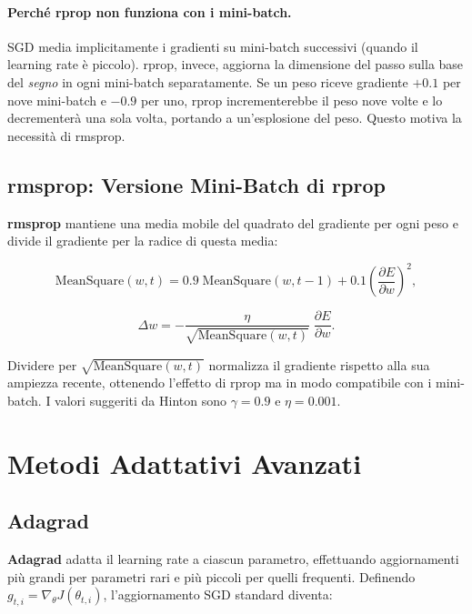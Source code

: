 \paragraph{Perché rprop non funziona con i mini-batch.}
SGD media implicitamente i gradienti su mini-batch successivi (quando il
learning rate è piccolo). rprop, invece, aggiorna la dimensione del passo sulla
base del \emph{segno} in ogni mini-batch separatamente. Se un peso riceve
gradiente $+0.1$ per nove mini-batch e $-0.9$ per uno, rprop incrementerebbe il
peso nove volte e lo decrementerà una sola volta, portando a un'esplosione del
peso. Questo motiva la necessità di rmsprop.

\subsection{rmsprop: Versione Mini-Batch di rprop}
\label{subsec:rmsprop}

\textbf{rmsprop} mantiene una media mobile del quadrato del gradiente per ogni
peso e divide il gradiente per la radice di questa media:

\begin{equation}
  \text{MeanSquare}(w, t) =
    0.9\;\text{MeanSquare}(w, t-1) + 0.1\left(\frac{\partial E}{\partial w}\right)^2,
\end{equation}

\begin{equation}
  \Delta w = -\frac{\eta}{\sqrt{\text{MeanSquare}(w,t)}}\;\frac{\partial E}{\partial w}.
\end{equation}

Dividere per $\sqrt{\text{MeanSquare}(w,t)}$ normalizza il gradiente rispetto
alla sua ampiezza recente, ottenendo l'effetto di rprop ma in modo compatibile
con i mini-batch. I valori suggeriti da Hinton sono $\gamma = 0.9$ e
$\eta = 0.001$.

\section{Metodi Adattativi Avanzati}
\label{sec:advanced-adaptive}

\subsection{Adagrad}
\label{subsec:adagrad}

\textbf{Adagrad} adatta il learning rate a ciascun parametro, effettuando
aggiornamenti più grandi per parametri rari e più piccoli per quelli frequenti.
Definendo $g_{t,i} = \nabla_\theta J(\theta_{t,i})$, l'aggiornamento SGD
standard diventa:

